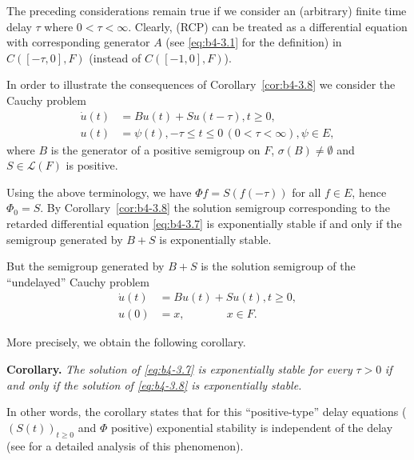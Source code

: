 The preceding considerations remain true if we consider an (arbitrary) finite time delay $\tau$ where $0 < \tau < \infty$. 
Clearly, (RCP) can be treated as a differential equation with corresponding generator $A$ (see \eqref{eq:b4-3.1} for the definition) in $C([-\tau,0],F)$ (instead of $C([-1,0],F)$).

\begin{example}\label{ex:b4-3.10}
	In order to illustrate the consequences of Corollary~\ref{cor:b4-3.8} we consider the Cauchy problem
	\begin{equation}\label{eq:b4-3.7}
		\begin{aligned}
		\dot{u}(t) &= Bu(t) + Su(t-\tau) , t \geq 0 ,\\
		u(t) &= \psi(t) , -\tau \leq t \leq 0 \,(0 < \tau < \infty) , \psi \in E ,
		\end{aligned}
	\end{equation}
	where $B$ is the generator of a positive semigroup on $F$, $\sigma(B) \neq \emptyset$ and $S \in \mathcal{L}(F)$ is positive.
	
	Using the above terminology, we have $\Phi f = S(f(-\tau))$ for all $f \in E$, hence $\Phi_{0} = S$. 
	By Corollary~\ref{cor:b4-3.8} the solution semigroup corresponding to the retarded differential equation \eqref{eq:b4-3.7} is exponentially stable if and only if the semigroup generated by $B + S$ is exponentially stable.
	
	But the semigroup generated by $B + S$ is the solution semigroup of the \enquote{undelayed} Cauchy problem
	\begin{equation}\label{eq:b4-3.8}
	\begin{aligned}
		\dot{u}(t) &= Bu(t) + Su(t) , t \geq 0 ,\\
		u(0) &= x , \quad\quad\quad\;\;\, x \in F.
	\end{aligned}
	\end{equation}
\end{example}
More precisely, we obtain the following corollary.

\medskip\noindent
\textbf{Corollary.}
		\textit{The solution of \eqref{eq:b4-3.7} is exponentially stable for every} $\tau > 0$ \textit{if and only if the solution of \eqref{eq:b4-3.8} is exponentially stable.}

\medskip	
In other words, the corollary states that for this \enquote{positive-type} delay equations ($(S(t))_{t\geq0}$ and $\Phi$ positive) exponential stability is independent of the delay (see \citet{kerscher:1986} for a detailed analysis of this phenomenon).
	
